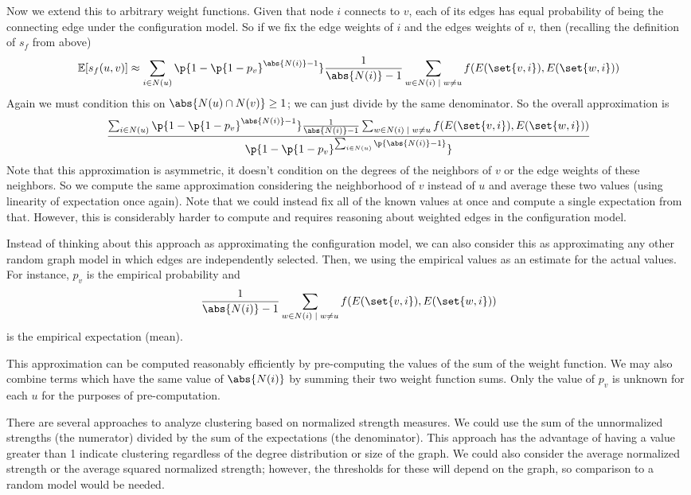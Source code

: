 \documentclass{pset}
\begin{document}
Now we extend this to arbitrary weight functions.
Given that node $i$ connects to $v$,
each of its edges has equal probability of being the connecting edge
under the configuration model.
So if we fix the edge weights of $i$ and the edges weights of $v$,
then (recalling the definition of $s_f$ from above)
\begin{align*}
    \Exp[s_f(u, v)]
    &\approx\sum_{i\in N(u)} \p{1 - \p{1 - p_v}^{\abs{N(i)} - 1}} 
    \frac{1}{\abs{N(i)} - 1}\sum_{w \in N(i) \;|\; w \neq u} f(E(\set{v, i}), E(\set{w, i})) \\
\end{align*}
Again we must condition this on $\abs{N(u) \cap N(v)} \geq 1$;
we can just divide by the same denominator.
So the overall approximation is
\[ \frac{\sum_{i\in N(u)} \p{1 - \p{1 - p_v}^{\abs{N(i)} - 1}} 
    \frac{1}{\abs{N(i)} - 1}\sum_{w \in N(i) \;|\; w \neq u} f(E(\set{v, i}), E(\set{w, i}))}
{ \p{1 - \p{1 - p_v}^{ \sum_{i\in N(u)} \p{\abs{N(i)} - 1}}}} \]
Note that this approximation is asymmetric, it doesn't condition
on the degrees of the neighbors of $v$ or the edge weights of these neighbors.
So we compute the same approximation considering the neighborhood of $v$
instead of $u$ and average these two values (using linearity of expectation
once again). Note that we could instead fix all of the known values at once
and compute a single expectation from that. However, this is considerably
harder to compute and requires reasoning about weighted edges in the
configuration model.

Instead of thinking about this approach as approximating the configuration
model, we can also consider this as approximating any other random
graph model in which edges are independently selected.
Then, we using the empirical values as an estimate for the actual values.
For instance, $p_v$ is the empirical probability and
\[\frac{1}{\abs{N(i)} - 1} \sum_{w \in N(i) \;|\; w \neq u} f(E(\set{v, i}), E(\set{w, i}))\]
is the empirical expectation (mean).

This approximation can be computed reasonably efficiently by pre-computing
the values of the sum of the weight function. We may also combine terms which
have the same value of $\abs{N(i)}$ by summing their two weight function sums.
Only the value of $p_v$ is unknown for each $u$ for the purposes of pre-computation.


There are several approaches to analyze clustering based on normalized strength
measures. We could use the sum of the unnormalized strengths (the
numerator) divided by the sum of the expectations (the denominator). This
approach has the advantage of having a value greater than 1 indicate clustering
regardless of the degree distribution or size of the graph.
We could also consider the average normalized strength or the average squared
normalized strength; however, the thresholds for these will depend on the graph,
so comparison to a random model would be needed.
\end{document}
